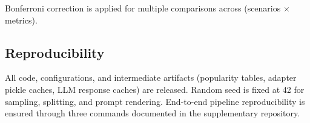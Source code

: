 Bonferroni correction is applied for multiple comparisons across (scenarios $\times$ metrics).

\subsection{Reproducibility}

All code, configurations, and intermediate artifacts (popularity tables, adapter pickle caches, LLM response caches) are released. Random seed is fixed at 42 for sampling, splitting, and prompt rendering. End-to-end pipeline reproducibility is ensured through three commands documented in the supplementary repository.
